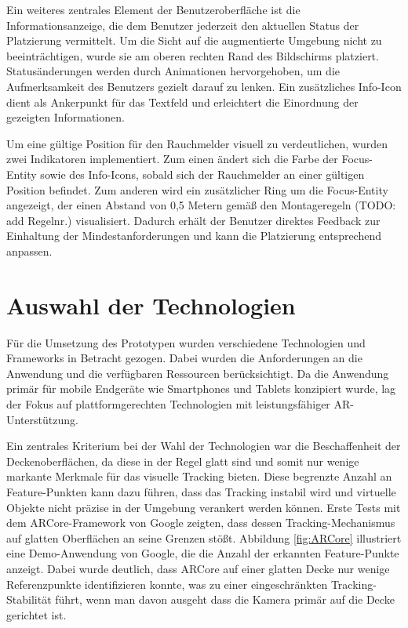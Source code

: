 Ein weiteres zentrales Element der Benutzeroberfläche ist die Informationsanzeige, die dem Benutzer jederzeit den aktuellen Status der Platzierung vermittelt. Um die Sicht auf die augmentierte Umgebung nicht zu beeinträchtigen, wurde sie am oberen rechten Rand des Bildschirms platziert. Statusänderungen werden durch Animationen hervorgehoben, um die Aufmerksamkeit des Benutzers gezielt darauf zu lenken. Ein zusätzliches Info-Icon dient als Ankerpunkt für das Textfeld und erleichtert die Einordnung der gezeigten Informationen.

Um eine gültige Position für den Rauchmelder visuell zu verdeutlichen, wurden zwei Indikatoren implementiert. Zum einen ändert sich die Farbe der Focus-Entity sowie des Info-Icons, sobald sich der Rauchmelder an einer gültigen Position befindet. Zum anderen wird ein zusätzlicher Ring um die Focus-Entity angezeigt, der einen Abstand von 0,5 Metern gemäß den Montageregeln (TODO: add Regelnr.) visualisiert. Dadurch erhält der Benutzer direktes Feedback zur Einhaltung der Mindestanforderungen und kann die Platzierung entsprechend anpassen.

\section{Auswahl der Technologien}

Für die Umsetzung des Prototypen wurden verschiedene Technologien und Frameworks in Betracht gezogen. Dabei wurden die Anforderungen an die Anwendung und die verfügbaren Ressourcen berücksichtigt. Da die Anwendung primär für mobile Endgeräte wie Smartphones und Tablets konzipiert wurde, lag der Fokus auf plattformgerechten Technologien mit leistungsfähiger AR-Unterstützung.

Ein zentrales Kriterium bei der Wahl der Technologien war die Beschaffenheit der Deckenoberflächen, da diese in der Regel glatt sind und somit nur wenige markante Merkmale für das visuelle Tracking bieten. Diese begrenzte Anzahl an Feature-Punkten kann dazu führen, dass das Tracking instabil wird und virtuelle Objekte nicht präzise in der Umgebung verankert werden können. Erste Tests mit dem ARCore-Framework von Google zeigten, dass dessen Tracking-Mechanismus auf glatten Oberflächen an seine Grenzen stößt. Abbildung \ref{fig:ARCore} illustriert eine Demo-Anwendung von Google, die die Anzahl der erkannten Feature-Punkte anzeigt. Dabei wurde deutlich, dass ARCore auf einer glatten Decke nur wenige Referenzpunkte identifizieren konnte, was zu einer eingeschränkten Tracking-Stabilität führt, wenn man davon ausgeht dass die Kamera primär auf die Decke gerichtet ist.

